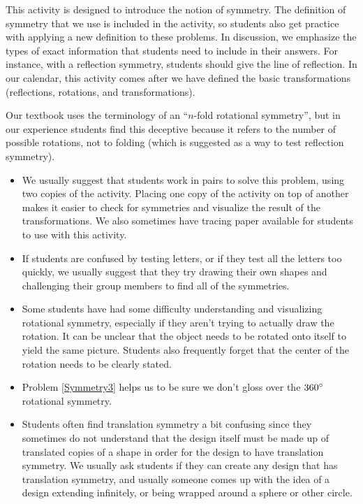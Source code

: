 \documentclass[nooutcomes]{ximera}
\begin{document}
\newpage
\begin{instructorNotes}
This activity is designed to introduce the notion of symmetry.  The definition of symmetry that we use is included in the activity, so students also get practice with applying a new definition to these problems.  In discussion, we emphasize the types of exact information that students need to include in their answers.  For instance, with a reflection symmetry, students should give the line of reflection.  In our calendar, this activity comes after we have defined the basic transformations (reflections, rotations, and transformations).

Our textbook uses the terminology of an ``$n$-fold rotational symmetry'', but in our experience students find this deceptive because it refers to the number of possible rotations, not to folding (which is suggested as a way to test reflection symmetry).  

\begin{itemize}
    \item We usually suggest that students work in pairs to solve this problem, using two copies of the activity.  Placing one copy of the activity on top of another makes it easier to check for symmetries and visualize the result of the transformations.  We also sometimes have tracing paper available for students to use with this activity.
    \item If students are confused by testing letters, or if they test all the letters too quickly, we usually suggest that they try drawing their own shapes and challenging their group members to find all of the symmetries.
    \item Some students have had some difficulty understanding and visualizing rotational symmetry, especially if they aren't trying to actually draw the rotation.  It can be unclear that the object needs to be rotated onto itself to yield the same picture.  Students also frequently forget that the center of the rotation needs to be clearly stated.
    \item Problem \ref{Symmetry3} helps us to be sure we don't gloss over the $360\degree$ rotational symmetry.
    \item Students often find translation symmetry a bit confusing since they sometimes do not understand that the design itself must be made up of translated copies of a shape in order for the design to have translation symmetry.  We usually ask students if they can create any design that has translation symmetry, and usually someone comes up with the idea of a design extending infinitely, or being wrapped around a sphere or other circle.


\end{itemize}



\end{instructorNotes}
\end{document}
